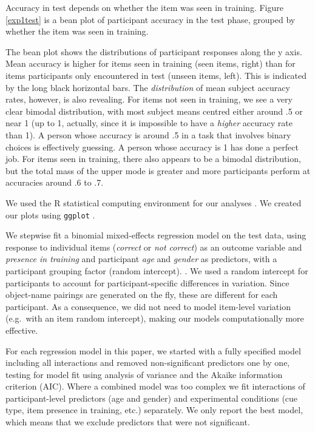 \documentclass{frontiersSCNS} %
\begin{document}
Accuracy in test depends on whether the item was seen in training. Figure \ref{exp1test} is a bean plot of participant accuracy in the test phase, grouped by whether the item was seen in training. 

The bean plot shows the distributions of participant responses along the y axis. Mean accuracy is higher for items seen in training
(seen items, right) than for items participants only encountered in test (unseen items, left). This is indicated by the long black horizontal bars. The \emph{distribution} of mean subject accuracy rates, however, is also revealing. For items not seen in training, we see a very clear bimodal
distribution, with most subject means centred either around .5 or near 1 (up to 1, actually, since it is impossible to have a
\emph{higher} accuracy rate than 1). A person whose accuracy is around .5 in a task that involves binary choices is effectively guessing. A person whose accuracy is 1
has done a perfect job.  For items seen in training, there also appears to be a bimodal distribution, but the total mass of the
upper mode is greater and more participants perform at accuracies around .6 to .7.


We used the R statistical computing environment for our analyses \citep{R}. We created our plots using \texttt{ggplot} \citep{ggplot}. 

We stepwise fit a binomial mixed-effects regression model on the test data, using response to individual items (\emph{correct} or \emph{not correct}) as an outcome variable and \emph{presence in training} and participant \emph{age} and \emph{gender} as predictors, with a participant grouping factor (random intercept). \citep{bates2012lme4,gelman2006data}. We used a random intercept for participants to account for participant-specific differences in variation. Since object-name pairings are generated on the fly, these are different for each participant. As a consequence, we did not need to model item-level variation (e.g.\ with an item random intercept), making our models computationally more effective.


For each regression model in this paper, we started with a fully specified model including all interactions and removed non-significant predictors one by one, testing for model fit using analysis of variance and the Akaike information criterion (AIC). Where a combined model was too complex we fit interactions of participant-level predictors (age and gender) and experimental conditions (cue type, item presence in training, etc.) separately. We only report the best model, which means that we exclude predictors that were not significant. 
\end{document}
